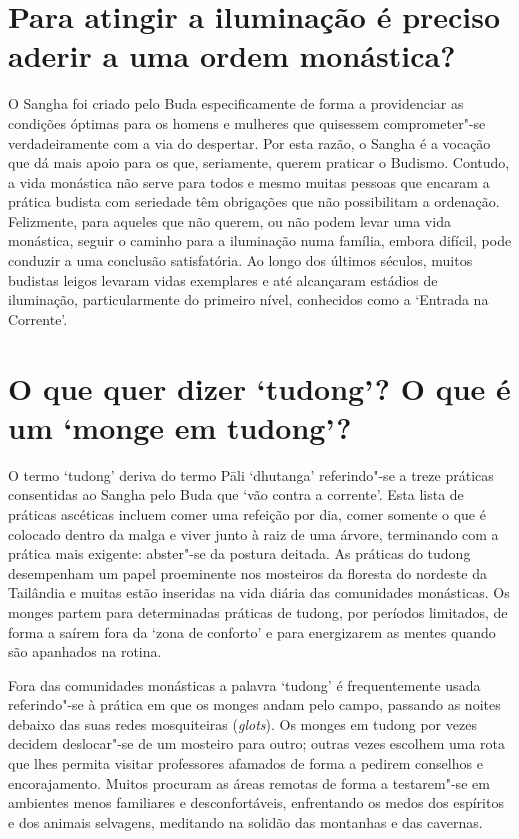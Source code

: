 \section{Para atingir a iluminação é preciso aderir a uma ordem monástica?}

O Sangha foi criado pelo Buda especificamente de forma a providenciar as
condições óptimas para os homens e mulheres que quisessem comprometer"-se
verdadeiramente com a via do despertar. Por esta razão, o Sangha é a
vocação que dá mais apoio para os que, seriamente, querem praticar o
Budismo. Contudo, a vida monástica não serve para todos e mesmo muitas
pessoas que encaram a prática budista com seriedade têm obrigações que
não possibilitam a ordenação. Felizmente, para aqueles que não querem,
ou não podem levar uma vida monástica, seguir o caminho para a
iluminação numa família, embora difícil, pode conduzir a uma conclusão
satisfatória. Ao longo dos últimos séculos, muitos budistas leigos
levaram vidas exemplares e até alcançaram estádios de iluminação,
particularmente do primeiro nível, conhecidos como a `Entrada na
Corrente'.

\section{O que quer dizer `tudong'? O que é um `monge em tudong'?}

O termo `tudong' deriva do termo Pāli `dhutanga' referindo"-se a
treze práticas consentidas ao Sangha pelo Buda que `vão contra a
corrente'. Esta lista de práticas ascéticas incluem comer uma refeição
por dia, comer somente o que é colocado dentro da malga e viver junto à
raiz de uma árvore, terminando com a prática mais exigente: abster"-se da
postura deitada. As práticas do tudong desempenham um papel proeminente
nos mosteiros da floresta do nordeste da Tailândia e muitas estão
inseridas na vida diária das comunidades monásticas. Os monges partem
para determinadas práticas de tudong, por períodos limitados, de forma a
saírem fora da `zona de conforto' e para energizarem as mentes quando
são apanhados na rotina.

Fora das comunidades monásticas a palavra `tudong' é frequentemente
usada referindo"-se à prática em que os monges andam pelo campo, passando
as noites debaixo das suas redes mosquiteiras (\emph{glots}). Os monges
em tudong por vezes decidem deslocar"-se de um mosteiro para outro;
outras vezes escolhem uma rota que lhes permita visitar professores
afamados de forma a pedirem conselhos e encorajamento. Muitos procuram
as áreas remotas de forma a testarem"-se em ambientes menos familiares e
desconfortáveis, enfrentando os medos dos espíritos e dos animais
selvagens, meditando na solidão das montanhas e das cavernas.

